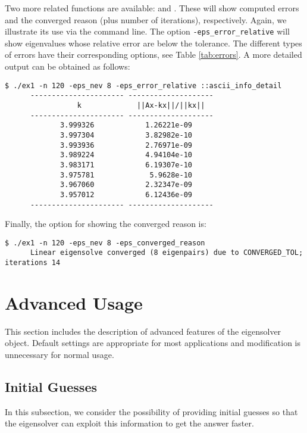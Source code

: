 Two more related functions are available:  and . These will show computed errors and the converged reason (plus number of iterations), respectively. Again, we illustrate its use via the command line. The option \Verb!-eps_error_relative! will show eigenvalues whose relative error are below the tolerance. The different types of errors have their corresponding options, see Table \ref{tab:errors}. A more detailed output can be obtained as follows:
\begin{Verbatim}[fontsize=\footnotesize,numbers=none]
   $ ./ex1 -n 120 -eps_nev 8 -eps_error_relative ::ascii_info_detail
      ---------------------- --------------------
                 k             ||Ax-kx||/||kx||
      ---------------------- --------------------
             3.999326            1.26221e-09
             3.997304            3.82982e-10
             3.993936            2.76971e-09
             3.989224            4.94104e-10
             3.983171            6.19307e-10
             3.975781             5.9628e-10
             3.967060            2.32347e-09
             3.957012            6.12436e-09
      ---------------------- --------------------
\end{Verbatim}

Finally, the option for showing the converged reason is:
\begin{Verbatim}[fontsize=\footnotesize,numbers=none]
   $ ./ex1 -n 120 -eps_nev 8 -eps_converged_reason
      Linear eigensolve converged (8 eigenpairs) due to CONVERGED_TOL; iterations 14
\end{Verbatim}

\section{Advanced Usage}

	This section includes the description of advanced features of the eigensolver object. Default settings are appropriate for most applications and modification is unnecessary for normal usage.

\subsection{Initial Guesses}

	In this subsection, we consider the possibility of providing initial guesses so that the eigensolver can exploit this information to get the answer faster.

